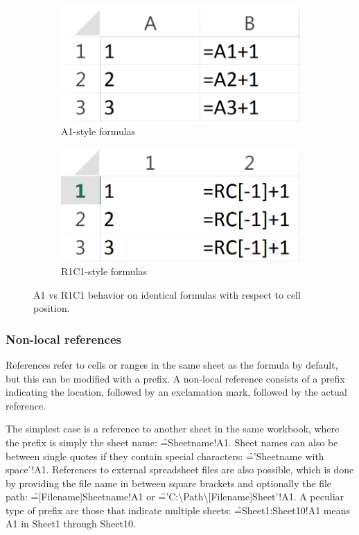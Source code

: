 \begin{figure}
\centerfloat
\begin{subfigure}[t]{0.35\textwidth}
\includegraphics[width=1\textwidth]{anatomy/r1c1comp-a1}
\caption{A1-style formulas}
\end{subfigure}
\hspace{0.1\textwidth}
\begin{subfigure}[t]{0.35\textwidth}
\includegraphics[width=1\textwidth]{anatomy/r1c1comp-r1c1}
\caption{R1C1-style formulas}
\end{subfigure}
\caption{A1 vs R1C1 behavior on identical formulas with respect to cell position.}
\label{fig:r1c1comp}
\end{figure}

\subsubsection{Non-local references}
\label{subsection:ExternalRefsDDE}

References refer to cells or ranges in the same sheet as the formula by default, but this can be modified with a prefix. A non-local reference consists of a prefix indicating the location, followed by an exclamation mark, followed by the actual reference.

The simplest case is a reference to another sheet in the same workbook, where the prefix is simply the sheet name: \f{=Sheetname!A1}.
Sheet names can also be between single quotes if they contain special characters: \f{='Sheetname with space'!A1}. 
References to external spreadsheet files are also possible, which is done by providing the file name in between square brackets and optionally the file path: \f{=[Filename]Sheetname!A1} or \f{='C:{\textbackslash}Path{\textbackslash}[Filename]Sheet'!A1}.
A peculiar type of prefix are those that indicate multiple sheets: \f{=Sheet1:Sheet10!A1} means A1 in Sheet1 through Sheet10.


